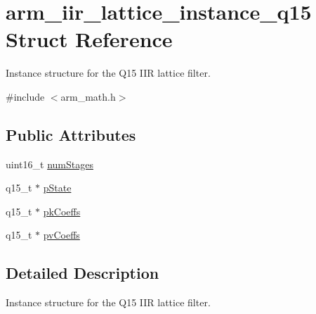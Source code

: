 \hypertarget{structarm__iir__lattice__instance__q15}{\section{arm\-\_\-iir\-\_\-lattice\-\_\-instance\-\_\-q15 Struct Reference}
\label{structarm__iir__lattice__instance__q15}
}


Instance structure for the Q15 I\-I\-R lattice filter.  




{\ttfamily \#include $<$arm\-\_\-math.\-h$>$}

\subsection*{Public Attributes}
\begin{DoxyCompactItemize}
\item 
uint16\-\_\-t \hyperlink{structarm__iir__lattice__instance__q15_a96fbed313bef01070409fa182d26ba3f}{num\-Stages}
\item 
q15\-\_\-t $\ast$ \hyperlink{structarm__iir__lattice__instance__q15_afd0136ab917b529554d93f41a5e04618}{p\-State}
\item 
q15\-\_\-t $\ast$ \hyperlink{structarm__iir__lattice__instance__q15_a41c214a1ec38d4a82fae8899d715dd29}{pk\-Coeffs}
\item 
q15\-\_\-t $\ast$ \hyperlink{structarm__iir__lattice__instance__q15_a4c4f57f45b223abbe2a9fb727bd2cad9}{pv\-Coeffs}
\end{DoxyCompactItemize}


\subsection{Detailed Description}
Instance structure for the Q15 I\-I\-R lattice filter. 

